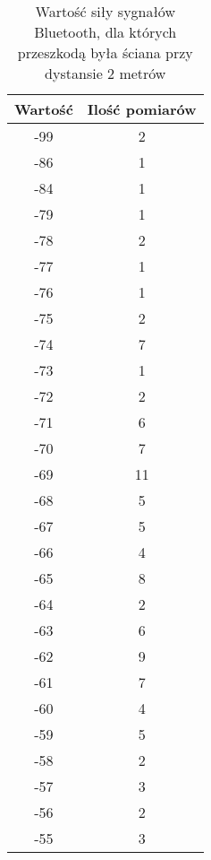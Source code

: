 \documentclass{article}
\begin{document}
\begin{table}[H]
	\caption {Wartość siły sygnałów Bluetooth, dla których przeszkodą była ściana przy dystansie 2 metrów}
\begin{center}
	\begin{tabular}{|c|c|}
		\hline
		Wartość & Ilość pomiarów \\ 
		\hline
		-99 & 2\\
		\hline
		-86 & 1\\
		\hline
		-84 & 1\\
		\hline
		-79 & 1\\
		\hline
		-78 & 2\\
		\hline
		-77 & 1\\
		\hline
		-76 & 1\\
		\hline
		-75 & 2\\
		\hline
		-74 & 7\\
		\hline
		-73 & 1\\
		\hline
		-72 & 2\\
		\hline
		-71 & 6\\
		\hline
		-70 & 7\\
		\hline
		-69 &11\\
		\hline
		-68 & 5\\
		\hline
		-67 & 5\\
		\hline
		-66 & 4\\
		\hline
		-65 & 8\\
		\hline
		-64 & 2\\
		\hline
		-63 & 6\\
		\hline
		-62 & 9\\
		\hline
		-61 & 7\\
		\hline
		-60 & 4\\
		\hline
		-59 & 5\\
		\hline
		-58 & 2\\
		\hline
		-57 & 3\\
		\hline
		-56 & 2\\
		\hline
		-55 & 3\\
		\hline
	\end{tabular}
\end{center}
\end{table}
\end{document}
